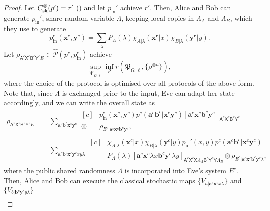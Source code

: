 \documentclass[10pt, a4paper]{article}
\numberwithin{equation}{section} %
\theoremstyle{definition}
\theoremstyle{plain}
\newcommand{\?}{\mathrel{?}} %
\newcommand{\cvec}[1]{\boldsymbol{\mathbf{#1}}}    %
\newcommand{\crv}[1]{\mathsf{#1}}
\newcommand{\proj}[2][]{{[#2]}_{#1}}
\newcommand{\compatstates}[3][]{\hat{\mathcal{P}}#1(#2,#3)}
\newcommand{\proto}[2][_{\Omega,\ell}]{\mathfrak{#2}#1}
\newcommand{\prin}[1][p]{#1_{\mathrm{in}}}
\newcommand{\sk}{\rm sk}
\begin{document}
\begin{proof}
               Let \(C_{\sk}^{\otimes}(p') = r'\) () and let \(\prin'\) achieve \(r'\). Then, Alice and Bob can generate \(\prin'\), share random variable \(\Lambda\), keeping local copies in \(\Lambda_A\) and \(\Lambda_B\), which they use to generate
               \[ \prin^c(\cvec{x}^c, \cvec{y}^c) = \sum_{\lambda} P_{\Lambda}(\lambda) \chi_{A|\lambda}(\cvec{x^c}|x)\chi_{B|\lambda}(\cvec{y^c}|y). \]
               Let \(\rho_{\crv{A}^c\crv{X}^c \crv{B}^c\crv{Y}^c E} \in \compatstates{p^c}{\prin^c}\) achieve
               \[ \sup_{\proto{P}} \inf_{\rho} r(\proto{P}, \{\rho^{\otimes n}\}), \]
               where the choice of the protocol is optimised over all protocols of the above form. Note that, since \(\Lambda\) is exchanged prior to the input, Eve can adapt her state accordingly, and we can write the overall state as
               \begin{align*}
                 \rho_{\crv{A}^c\crv{X}^c \crv{B}^c\crv{Y}^c E} &= \sum_{\cvec{a}^c\cvec{b}^c \cvec{x}^c\cvec{y}^c} \begin{aligned}[c]
          & \prin^c(\cvec{x}^c,\cvec{y}^c) p^c(\cvec{a}^c\cvec{b}^c|\cvec{x}^c\cvec{y}^c) \proj[\crv{A}^c\crv{X}^c \crv{B}^c\crv{Y}^c]{\cvec{a}^c\cvec{x}^c\cvec{b}^c\cvec{y}^c} \\
                   \otimes & \rho_{E^c|\cvec{a}^c\cvec{x}^c \cvec{b}^c\cvec{y}^c},
                 \end{aligned} \\
                                                                &= \sum_{\cvec{a}^c\cvec{b}^c \cvec{x}^c\cvec{y}^c xy\lambda} \begin{aligned}[c]
          & \chi_{A|\lambda}(\cvec{x}^c|x) \chi_{B|\lambda}(\cvec{y}^c|y) \prin'(x,y) p^c(\cvec{a}^c\cvec{b}^c|\cvec{x}^c\cvec{y}^c) \\
          & P_{\Lambda}(\lambda) \proj[\crv{A}^c\crv{X}^c\crv{X}\Lambda_A \crv{B}^c\crv{Y}^c\crv{Y}\Lambda_B]{\cvec{a}^c\cvec{x}^c\lambda{x} \cvec{b}^c\cvec{y}^c\lambda{y}} \otimes \rho_{E^c|\cvec{a}^c\cvec{x}^c \cvec{b}^c\cvec{y}^c\lambda},
                 \end{aligned}
                 \end{align*}
                 where the public shared randomness \(\Lambda\) is incorporated into Eve's system \(E^c\). Then, Alice and Bob can execute the classical stochastic maps \(\{V_{a|\cvec{a}^c\cvec{x}^c x\lambda}\}\) and \(\{V_{b|\cvec{b}^c\cvec{y}^c y\lambda}\}\)
                 \begin{align*}

\end{align*}
\end{proof}
\end{document}
